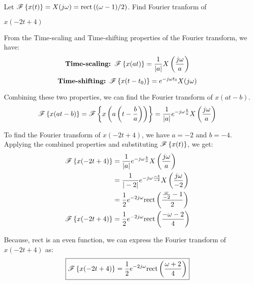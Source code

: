 \documentclass[a4paper, 10pt]{article}
\begin{document}
\begin{problem}
    Let \( \mathscr{F} \left\{ x(t) \right\} = X(j\omega) = \textrm{rect} \left( (\omega-1)/2 \right) \). Find Fourier tranform of
\end{problem}

\begin{tosubmit}
\begin{subproblems}[start=1]
    \item \( x(-2t+4) \)
\end{subproblems}

\par\noindent\submitsolution
From the Time-scaling and Time-shifting properties of the Fourier transform, we have:
\[
    \textbf{Time-scaling: } \mathscr{F} \left\{ x(at) \right\} = \frac{1}{|a|} X\left( \frac{j\omega}{a} \right)
\]
\[
    \textbf{Time-shifting: } \mathscr{F} \left\{ x(t - t_0) \right\} = e^{-j\omega t_0} X(j\omega)
\]

Combining these two properties, we can find the Fourier transform of \( x(at - b) \).
\[
    \mathscr{F} \left\{ x(at - b) \right\} = \mathscr{F} \left\{ x \left( a \left( t - \frac{b}{a} \right) \right) \right\} = \frac{1}{|a|} e^{-j\omega \frac{b}{a}} X\left( \frac{j\omega}{a} \right)
\]

To find the Fourier transform of \( x(-2t + 4) \), we have \( a = -2 \) and \( b = -4 \). Applying the combined properties and substituting \( \mathscr{F} \left\{ x(t) \right\} \), we get:
\begin{align*}  
    \mathscr{F} \left\{ x(-2t + 4) \right\} &= \frac{1}{|a|} e^{-j\omega \frac{b}{a}} X\left( \frac{j\omega}{a} \right) \\
    &= \frac{1}{|-2|} e^{-j\omega \frac{-4}{-2}} X\left( \frac{j\omega}{-2} \right) \\
    &= \frac{1}{2} e^{-2j\omega} \textrm{rect} \left( \frac{\frac{\omega}{-2} - 1}{2} \right) \\
    \mathscr{F} \left\{ x(-2t + 4) \right\} &= \frac{1}{2} e^{-2j\omega} \textrm{rect} \left( \frac{-\omega - 2}{4} \right)
\end{align*}

Because, \( \textrm{rect} \) is an even function, we can express the Fourier transform of \( x(-2t + 4) \) as:
\[ \boxed{
    \mathscr{F} \left\{ x(-2t + 4) \right\} = \frac{1}{2} e^{-2j\omega} \textrm{rect} \left( \frac{\omega + 2}{4} \right)
} \]
\end{tosubmit}
\end{document}
